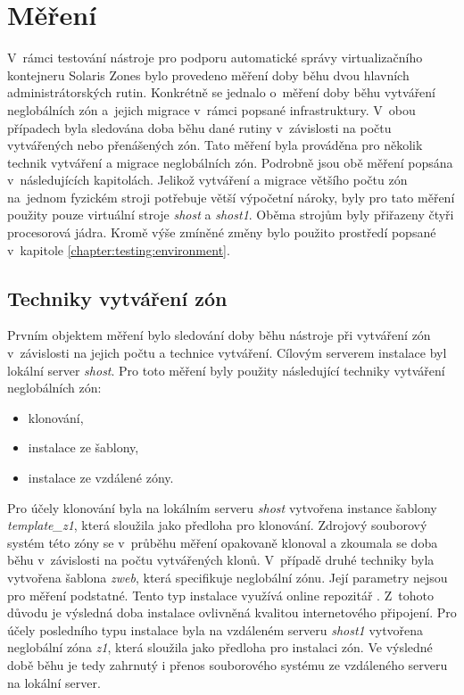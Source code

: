 \section{Měření}
\label{chapter:measurement}
V~rámci testování nástroje pro podporu automatické správy virtualizačního kontejneru Solaris Zones bylo provedeno měření doby
běhu dvou hlavních administrátorských rutin. Konkrétně se jednalo o~měření doby běhu vytváření neglobálních zón a~jejich migrace
v~rámci popsané infrastruktury. V~obou případech byla sledována doba běhu dané rutiny v~závislosti na počtu vytvářených nebo
přenášených zón. Tato měření byla prováděna pro několik technik vytváření a migrace neglobálních zón. Podrobně jsou obě měření
popsána v~následujících kapitolách. Jelikož vytváření a migrace většího počtu zón na~jednom fyzickém stroji potřebuje větší 
výpočetní nároky, byly pro tato měření použity pouze virtuální stroje \textit{shost} a \textit{shost1}. Oběma strojům byly
přiřazeny čtyři procesorová jádra. Kromě výše zmíněné změny bylo použito prostředí popsané v~kapitole \ref{chapter:testing:environment}.
\subsection{Techniky vytváření zón}
\label{chapter:measurement:creation}
Prvním objektem měření bylo sledování doby běhu nástroje při vytváření zón v~závislosti na jejich počtu a technice vytváření. Cílovým
serverem instalace byl lokální server \textit{shost}. Pro toto měření byly použity následující techniky vytváření neglobálních zón:
\begin{itemize}
 \item klonování,
 \item instalace ze šablony,
 \item instalace ze vzdálené zóny.
\end{itemize}
Pro účely klonování byla na lokálním serveru \textit{shost} vytvořena instance šablony \textit{template\_z1}, která sloužila jako 
předloha pro klonování. Zdrojový souborový systém této zóny se v~průběhu měření opakovaně klonoval a zkoumala se doba běhu
v~závislosti na počtu vytvářených klonů. V~případě druhé techniky byla vytvořena šablona \textit{zweb}, která specifikuje neglobální
zónu. Její parametry nejsou pro měření podstatné. Tento typ instalace využívá online repozitář \cite{oracle:solaris:desing:pkg_repository}.
Z~tohoto důvodu je výsledná doba instalace ovlivněná kvalitou internetového připojení. Pro účely posledního typu instalace byla
na vzdáleném serveru \textit{shost1} vytvořena neglobální zóna \textit{z1}, která sloužila jako předloha pro instalaci zón. Ve
výsledné době běhu je tedy zahrnutý i přenos souborového systému ze vzdáleného serveru na lokální server.

